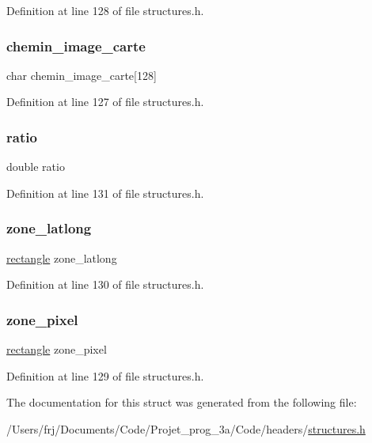 Definition at line 128 of file structures.\+h.

\hypertarget{structcarte_a14ecc94c2719b58bbfd7b6249ff3ad4b}{}\label{structcarte_a14ecc94c2719b58bbfd7b6249ff3ad4b} 
\subsubsection{\texorpdfstring{chemin\+\_\+image\+\_\+carte}{chemin\_image\_carte}}
{\footnotesize\ttfamily char chemin\+\_\+image\+\_\+carte\mbox{[}128\mbox{]}}



Definition at line 127 of file structures.\+h.

\hypertarget{structcarte_aa422b0077d0c570937a73aa5b8eb4440}{}\label{structcarte_aa422b0077d0c570937a73aa5b8eb4440} 
\subsubsection{\texorpdfstring{ratio}{ratio}}
{\footnotesize\ttfamily double ratio}



Definition at line 131 of file structures.\+h.

\hypertarget{structcarte_ad42edc35194368fcf17c221930cbabe0}{}\label{structcarte_ad42edc35194368fcf17c221930cbabe0} 
\subsubsection{\texorpdfstring{zone\+\_\+latlong}{zone\_latlong}}
{\footnotesize\ttfamily \hyperlink{structrectangle}{rectangle} zone\+\_\+latlong}



Definition at line 130 of file structures.\+h.

\hypertarget{structcarte_addf5558f9faa154e716d68678b042f98}{}\label{structcarte_addf5558f9faa154e716d68678b042f98} 
\subsubsection{\texorpdfstring{zone\+\_\+pixel}{zone\_pixel}}
{\footnotesize\ttfamily \hyperlink{structrectangle}{rectangle} zone\+\_\+pixel}



Definition at line 129 of file structures.\+h.



The documentation for this struct was generated from the following file\+:\begin{DoxyCompactItemize}
\item 
/\+Users/frj/\+Documents/\+Code/\+Projet\+\_\+prog\+\_\+3a/\+Code/headers/\hyperlink{structures_8h}{structures.\+h}\end{DoxyCompactItemize}

